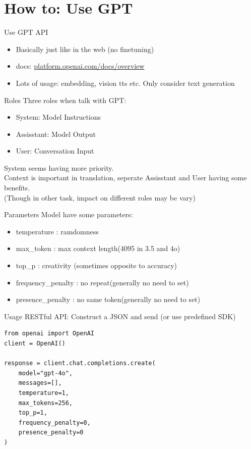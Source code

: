 \documentclass{beamer}
\begin{document}
\section{How to: Use GPT}

\begin{frame}{Use GPT API}
    \begin{itemize}
        \item Basically just like in the web (no finetuning)
        \item docs: \url{platform.openai.com/docs/overview}
        \item Lots of usage: embedding, vision tts etc.
        \newline Only consider text generation
    \end{itemize}
\end{frame}

\begin{frame}{Roles}
    Three roles when talk with GPT:
    \begin{itemize}
        \item System: Model Instructions
        \item Assisstant: Model Output
        \item User: Conversation Input
    \end{itemize}
    System seems having more priority. \\
    Context is important in translation, seperate Assisstant and User having some benefits. \\
    \bigskip
    (Though in other task, impact on different roles may be vary)
\end{frame}

\begin{frame}{Parameters}
    Model have some parameters:
    \begin{itemize}
        \item temperature : ramdomness
        \item max\_token : max context length(4095 in 3.5 and 4o)
        \item top\_p : creativity (sometimes opposite to accuracy)
        \item frequency\_penalty : no repeat(generally no need to set)
        \item presence\_penalty : no same token(generally no need to set)
    \end{itemize}
\end{frame}

\begin{frame}[fragile]{Usage}
    RESTful API: Construct a JSON and send (or use predefined SDK)
    \begin{verbatim}
from openai import OpenAI
client = OpenAI()

response = client.chat.completions.create(
    model="gpt-4o",
    messages=[],
    temperature=1,
    max_tokens=256,
    top_p=1,
    frequency_penalty=0,
    presence_penalty=0
)
    \end{verbatim}
\end{frame}
\end{document}
